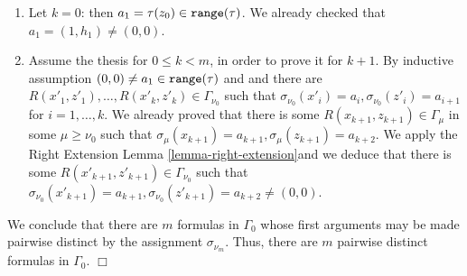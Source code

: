 \documentclass[a4paper,12pt]{article}
\newenvironment{proof}[1][Proof]{\begin{trivlist}
\item[\hskip \labelsep {\bfseries #1}]}{\end{trivlist}}
\newcommand{\Backward}         { {\tt B} }
\newcommand{\Forward}         { {\tt F} }
\newcommand{\id}              { {\tt id} }
\newcommand{\range}           { {\tt range} }
\begin{document}
\begin{proof}
\begin{enumerate}
\item
Let $k=0$: then $a_{1} = \tau(z_0) \in \range(\tau)$. We already checked that $a_1 = (1,h_1) \not = (0,0)$. 
\item
Assume the thesis for $0 \le k < m$, in order to prove it for $k+1$. By inductive assumption $(0,0) \not = a_{1} \in \range(\tau)$ and and there are $R(x'_1, z'_1), \ldots, R(x'_k, z'_k) \in \Gamma_{\nu_0}$ such that $\sigma_{\nu_0}(x'_i)=a_i, \sigma_{\nu_0}(z'_i)=a_{i+1}$ for $i=1, \ldots, k$. We already proved that there is some $R(x_{k+1},z_{k+1}) \in \Gamma_\mu$ in some $\mu \ge {\nu_0}$ such that $\sigma_{\mu}(x_{k+1})=a_{k+1}, \sigma_\mu(z_{k+1})=a_{k+2}$. We apply the Right Extension Lemma \ref{lemma-right-extension}and we deduce that there is some $R(x'_{k+1}, z'_{k+1}) \in \Gamma_{\nu_0}$ such that $\sigma_{\nu_0}(x'_{k+1})=a_{k+1}, \sigma_{\nu_0}(z'_{k+1})=a_{k+2} \not = (0,0)$.  
\end{enumerate}
We conclude that there are $m$ formulas in $\Gamma_0$ whose first arguments may be made pairwise distinct by the assignment $\sigma_{\nu_m}$. Thus, there are $m$ pairwise distinct formulas in $\Gamma_0$.
$\Box$ \end{proof}
 
\end{document}
